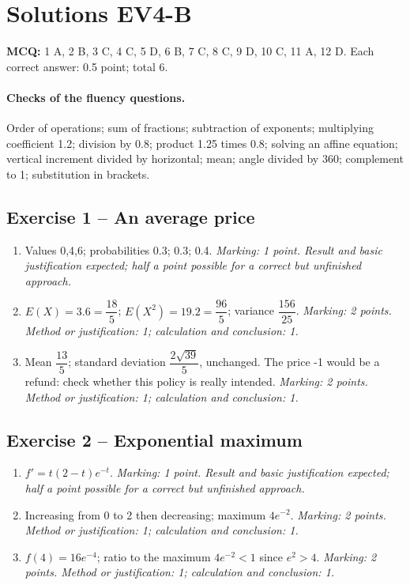 \mxnewpage\section*{Solutions EV4-B}\label{EV4-B-CORR}
\textbf{MCQ:} 1 A, 2 B, 3 C, 4 C, 5 D, 6 B, 7 C, 8 C, 9 D, 10 C, 11 A, 12 D. Each correct answer: \num{0,5} point; total 6.
\paragraph{Checks of the fluency questions.} Order of operations; sum of fractions; subtraction of exponents; multiplying coefficient \num{1,2}; division by \num{0,8}; product \num{1,25} times \num{0,8}; solving an affine equation; vertical increment divided by horizontal; mean; angle divided by 360; complement to 1; substitution in brackets.
\subsection*{Exercise 1 -- An average price}
\begin{enumerate}
\item Values 0,4,6; probabilities \num{0,3}; \num{0,3}; \num{0,4}. \textit{Marking: 1 point. Result and basic justification expected; half a point possible for a correct but unfinished approach.}
\item $E(X)=\num{3,6}=\dfrac{18}{5}$; $E(X^2)=\num{19,2}=\dfrac{96}{5}$; variance $\dfrac{156}{25}$. \textit{Marking: 2 points. Method or justification: 1; calculation and conclusion: 1.}
\item Mean $\dfrac{13}{5}$; standard deviation $\dfrac{2\sqrt {39}}{5}$, unchanged. The price -1 would be a refund: check whether this policy is really intended. \textit{Marking: 2 points. Method or justification: 1; calculation and conclusion: 1.}
\end{enumerate}
\subsection*{Exercise 2 -- Exponential maximum}
\begin{enumerate}
\item $f\prime=t(2-t)e^{-t}$. \textit{Marking: 1 point. Result and basic justification expected; half a point possible for a correct but unfinished approach.}
\item Increasing from 0 to 2 then decreasing; maximum $4e^{-2}$. \textit{Marking: 2 points. Method or justification: 1; calculation and conclusion: 1.}
\item $f(4)=16e^{-4}$; ratio to the maximum $4e^{-2}<1$ since $e^2>4$. \textit{Marking: 2 points. Method or justification: 1; calculation and conclusion: 1.}
\end{enumerate}
